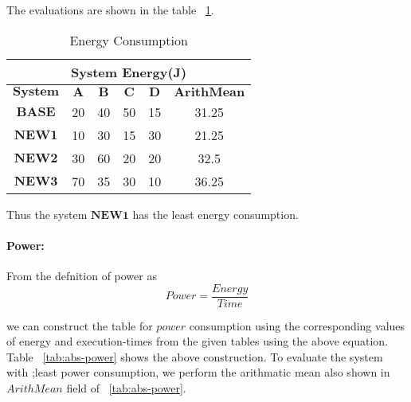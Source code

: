 \documentclass{tufte-handout}
\begin{document}
	  The evaluations are shown in the table ~\ref{tab:exec-energy}. 
	
	\begin{table}[!htb]
	    \centering
	    \selectfont
		\renewcommand{\arraystretch}{3.0}
		\label{tab:exec-energy}
	    \begin{tabular}{c|c|c|c|c|c}
	      \toprule
		  \multicolumn{6}{|c|}{System Energy(J)}  \\
	      \midrule 
		  $\textbf{System}$ & $\textbf{A}$ & $\textbf{B}$ & $\textbf{C}$ & $\textbf{D}$ & $\textbf{ArithMean}$ \\  %
		  $\textbf{BASE}$ & 20 & 40 & 50 & 15 & 31.25 \\
		  $\textbf{NEW1}$ & 10 & 30 & 15 & 30 & 21.25 \\
		  $\textbf{NEW2}$ & 30 & 60 & 20 & 20 & 32.5 \\
		  $\textbf{NEW3}$ & 70 & 35 & 30 & 10 & 36.25 \\
	      \bottomrule
	    \end{tabular}
	    \caption{ Energy Consumption }
	  \end{table}

	  Thus the system $\textbf{NEW1}$ has the least energy consumption.

	  \paragraph{Power: } From the defnition of power as
	  	\[
			Power = \dfrac{Energy}{Time} 
		\]

		we can construct the table for $power$ consumption using the corresponding values of energy and execution-times from the given tables using the above equation. Table ~\ref{tab:abs-power} shows the above construction. To evaluate the system with ;least power consumption, we perform the arithmatic mean also shown in $ArithMean$ field of ~\ref{tab:abs-power}.
\end{document}
